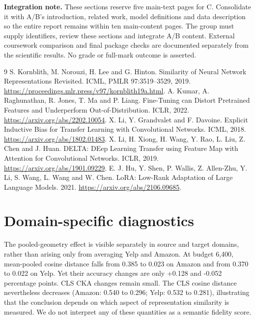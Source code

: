 \documentclass[a4paper,10pt]{article}
\begin{document}
\textbf{Integration note.} These sections reserve five main-text pages for C. Consolidate it with A/B's introduction, related work, model definitions and data description so the entire report remains within ten main-content pages. The group must supply identifiers, review these sections and integrate A/B content. External coursework comparison and final package checks are documented separately from the scientific results. No grade or full-mark outcome is asserted.

\clearpage
\begin{thebibliography}{9}
 S. Kornblith, M. Norouzi, H. Lee and G. Hinton. Similarity of Neural Network Representations Revisited. ICML, PMLR 97:3519--3529, 2019. \url{https://proceedings.mlr.press/v97/kornblith19a.html}.
 A. Kumar, A. Raghunathan, R. Jones, T. Ma and P. Liang. Fine-Tuning can Distort Pretrained Features and Underperform Out-of-Distribution. ICLR, 2022. \url{https://arxiv.org/abs/2202.10054}.
 X. Li, Y. Grandvalet and F. Davoine. Explicit Inductive Bias for Transfer Learning with Convolutional Networks. ICML, 2018. \url{https://arxiv.org/abs/1802.01483}.
 X. Li, H. Xiong, H. Wang, Y. Rao, L. Liu, Z. Chen and J. Huan. DELTA: DEep Learning Transfer using Feature Map with Attention for Convolutional Networks. ICLR, 2019. \url{https://arxiv.org/abs/1901.09229}.
 E. J. Hu, Y. Shen, P. Wallis, Z. Allen-Zhu, Y. Li, S. Wang, L. Wang and W. Chen. LoRA: Low-Rank Adaptation of Large Language Models. 2021. \url{https://arxiv.org/abs/2106.09685}.
\end{thebibliography}
\clearpage
\appendix
\section{Domain-specific diagnostics}
\begin{center}
{\fontsize{8.5}{10}\selectfont\setlength{\tabcolsep}{3.5pt}}
\end{center}
The pooled-geometry effect is visible separately in source and target domains, rather than arising only from averaging Yelp and Amazon. At budget 6,400, mean-pooled cosine distance falls from 0.385 to 0.023 on Amazon and from 0.370 to 0.022 on Yelp. Yet their accuracy changes are only +0.128 and -0.052 percentage points. CLS CKA changes remain small. The CLS cosine distance nevertheless decreases (Amazon: 0.540 to 0.296; Yelp: 0.532 to 0.281), illustrating that the conclusion depends on which aspect of representation similarity is measured. We do not interpret any of these quantities as a semantic fidelity score.
\end{document}
